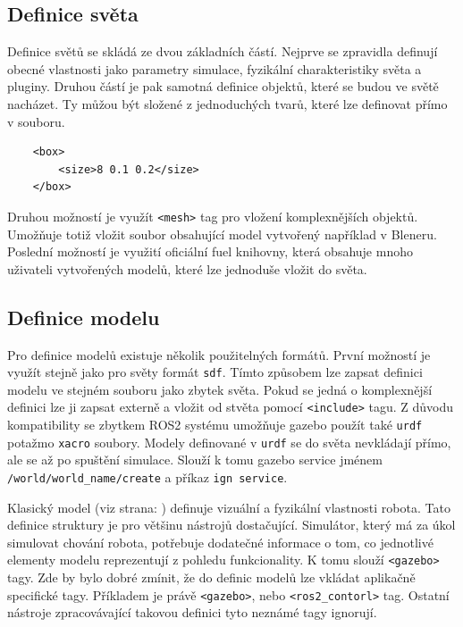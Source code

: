 \subsection*{Definice světa}
Definice světů se skládá ze dvou základních částí. Nejprve se zpravidla definují obecné vlastnosti jako parametry simulace, fyzikální charakteristiky světa a pluginy. Druhou částí je pak samotná definice objektů, které se budou ve světě nacházet. Ty můžou být složené z jednoduchých tvarů, které lze definovat přímo v souboru.
\begin{verbatim}
	<box>
		<size>8 0.1 0.2</size>
	</box>
\end{verbatim}
 Druhou možností je využít \verb|<mesh>| tag pro vložení komplexnějších objektů. Umožňuje totiž vložit soubor obsahující model vytvořený například v Bleneru. Poslední možností je využití oficiální fuel knihovny, která obsahuje mnoho uživateli vytvořených modelů, které lze jednoduše vložit do světa.

\subsection*{Definice modelu}
Pro definice modelů existuje několik použitelných formátů. První možností je využít stejně jako pro světy formát \verb|sdf|. Tímto způsobem lze zapsat definici modelu ve stejném souboru jako zbytek světa. Pokud se jedná o komplexnější definici lze ji zapsat externě a vložit od stvěta pomocí \verb|<include>| tagu. Z důvodu kompatibility se zbytkem ROS2 systému umožňuje gazebo použít také \verb|urdf| potažmo \verb|xacro| soubory. Modely definované v \verb|urdf| se do světa nevkládají přímo, ale  se až po spuštění simulace. Slouží k tomu gazebo service jménem \verb|/world/world_name/create| a příkaz \verb|ign service|.

Klasický model (viz strana: \pageref{implementation:model}) definuje vizuální a fyzikální vlastnosti robota. Tato definice struktury je pro většinu nástrojů dostačující. Simulátor, který má za úkol simulovat chování robota, potřebuje dodatečné informace o tom, co jednotlivé elementy modelu reprezentují z pohledu funkcionality. K tomu slouží \verb|<gazebo>| tagy. Zde by bylo dobré zmínit, že do definic modelů lze vkládat aplikačně specifické tagy. Příkladem je právě \verb|<gazebo>|, nebo \verb|<ros2_contorl>| tag. Ostatní nástroje zpracovávající takovou definici tyto neznámé tagy ignorují.

